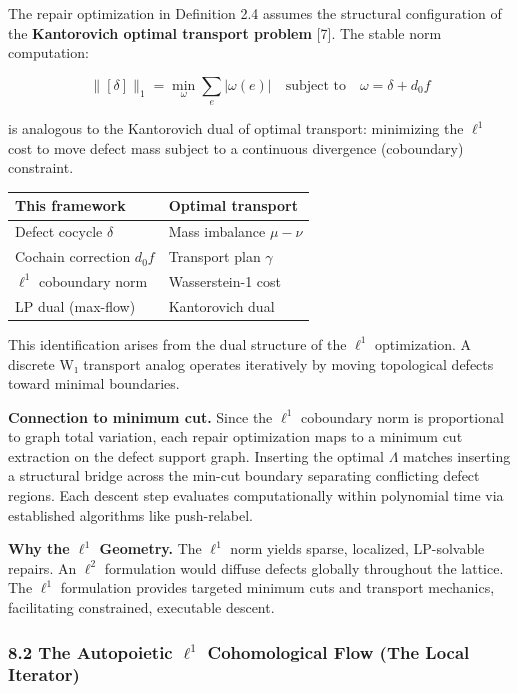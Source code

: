 \documentclass[
]{article}
\begin{document}
The repair optimization in Definition 2.4 assumes the structural
configuration of the \textbf{Kantorovich optimal transport problem}
{[}7{]}. The stable norm computation:

\[\|[\delta]\|_1 = \min_{\omega} \sum_e |\omega(e)| \quad \text{subject to} \quad \omega = \delta + d_0 f\]

is analogous to the Kantorovich dual of optimal transport: minimizing
the \(\ell^1\) cost to move defect mass subject to a continuous
divergence (coboundary) constraint.

\begin{longtable}[]{@{}ll@{}}
\toprule\noalign{}
This framework & Optimal transport \\
\midrule\noalign{}
\endhead
\bottomrule\noalign{}
\endlastfoot
Defect cocycle \(\delta\) & Mass imbalance \(\mu - \nu\) \\
Cochain correction \(d_0 f\) & Transport plan \(\gamma\) \\
\(\ell^1\) coboundary norm & Wasserstein-1 cost \\
LP dual (max-flow) & Kantorovich dual \\
\end{longtable}

This identification arises from the dual structure of the \(\ell^1\)
optimization. A discrete W₁ transport analog operates iteratively by
moving topological defects toward minimal boundaries.

\textbf{Connection to minimum cut.} Since the \(\ell^1\) coboundary norm
is proportional to graph total variation, each repair optimization maps
to a minimum cut extraction on the defect support graph. Inserting the
optimal \(\Lambda\) matches inserting a structural bridge across the
min-cut boundary separating conflicting defect regions. Each descent
step evaluates computationally within polynomial time via established
algorithms like push-relabel.

\textbf{Why the \(\ell^1\) Geometry.} The \(\ell^1\) norm yields sparse,
localized, LP-solvable repairs. An \(\ell^2\) formulation would diffuse
defects globally throughout the lattice. The \(\ell^1\) formulation
provides targeted minimum cuts and transport mechanics, facilitating
constrained, executable descent.

\subsubsection{\texorpdfstring{8.2 The Autopoietic \(\ell^1\)
Cohomological Flow (The Local
Iterator)}{8.2 The Autopoietic \textbackslash ell\^{}1 Cohomological Flow (The Local Iterator)}}\label{the-autopoietic-ell1-cohomological-flow-the-local-iterator}
\end{document}
